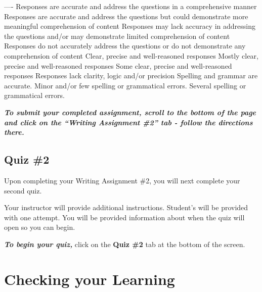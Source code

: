 \documentclass[
]{book}
\begin{document}
\begin{assessment}
\textbar\textbar--\textbar--\textbar-\textbar{}
\textbar Responses are accurate and address the questions in a comprehensive manner \textbar Responses are accurate and address the questions but could demonstrate more meaningful comprehension of content \textbar Responses may lack accuracy in addressing the questions and/or may demonstrate limited comprehension of content \textbar{} Responses do not accurately address the questions or do not demonstrate any comprehension of content \textbar{}
\textbar Clear, precise and well-reasoned responses \textbar Mostly clear, precise and well-reasoned responses \textbar Some clear, precise and well-reasoned responses \textbar Responses lack clarity, logic and/or precision \textbar{}
\textbar{} \textbar Spelling and grammar are accurate. \textbar Minor and/or few spelling or grammatical errors. \textbar{} Several spelling or grammatical errors. \textbar{}

\textbf{\emph{To submit your completed assignment, scroll to the bottom of the page and click on the ``Writing Assignment \#2'' tab - follow the directions there.}}

\hypertarget{quiz-2}{%
\subsection*{\texorpdfstring{\textbf{Quiz \#2}}{Quiz \#2}}\label{quiz-2}}

Upon completing your Writing Assignment \#2, you will next complete your second quiz.

Your instructor will provide additional instructions. Student's will be provided with one attempt. You will be provided information about when the quiz will open so you can begin.

\textbf{\emph{To begin your quiz,}} click on the \textbf{Quiz \#2} tab at the bottom of the screen.
\end{assessment}

\hypertarget{checking-your-learning-8}{%
\section*{Checking your Learning}\label{checking-your-learning-8}}
\end{document}
